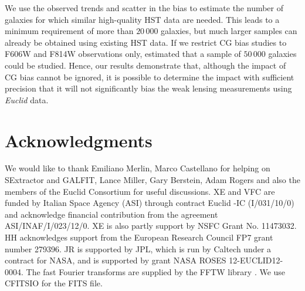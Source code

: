 \documentclass[useAMS,usenatbib]{mnras}
\begin{document}
We use the observed trends and scatter in the bias to estimate the number of galaxies for which similar high-quality HST data are needed. This leads to a minimum requirement of more than $20\,000$ galaxies,
but much larger samples can already be obtained using existing HST data. If we restrict CG bias studies to F606W and F814W observations only,  estimated that a sample of $50\,000$ galaxies could be studied. Hence, our results demonstrate that, although the impact of CG bias cannot be ignored, it is possible to determine the impact with sufficient precision that it will not significantly bias the weak lensing measurements using {\it Euclid} data.

\section*{Acknowledgments}

We would like to thank Emiliano Merlin, Marco Castellano for helping
on {\sc SExtractor} and {\sc GALFIT}, Lance Miller, Gary Berstein, Adam Rogers and also
the members of the Euclid Consortium for useful discussions. XE and VFC
are funded by Italian Space Agency (ASI) through contract Euclid -IC (I/031/10/0) and
acknowledge financial contribution from the agreement ASI/INAF/I/023/12/0. XE is also partly
support by NSFC Grant No. 11473032. HH acknowledges support from the European
Research Council FP7 grant number 279396. JR is supported by JPL, which is
run by Caltech under a contract for NASA, and is supported by grant
NASA ROSES 12-EUCLID12- 0004. The fast Fourier transforms are supplied
by the FFTW library \citep{fftw05}. We use CFITSIO
\citep{1999ASPC..172..487P} for the FITS file.



\end{document}

